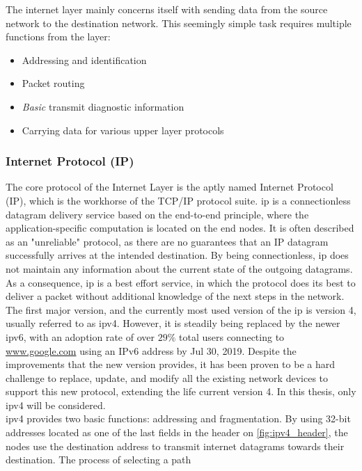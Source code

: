 The internet layer mainly concerns itself with sending data from the source
network to the destination network. This seemingly simple task requires multiple
functions from the layer:
\begin{itemize}
    \item Addressing and identification
    \item Packet routing
    \item \emph{Basic} transmit diagnostic information
    \item Carrying data for various upper layer protocols
\end{itemize}

\subsubsection{Internet Protocol (IP)}
The core protocol of the Internet Layer is the aptly named Internet Protocol
(IP), which is the workhorse of the TCP/IP protocol suite.
\gls{ip} is a connectionless datagram delivery service based on the
end-to-end principle, where the application-specific computation is located on
the end nodes. It is often described as an "unreliable" protocol, as there are
no guarantees that an IP datagram successfully arrives at the intended
destination. By being connectionless, \gls{ip} does not maintain any
information about the current state of the outgoing datagrams.
As a consequence, \gls{ip} is a best effort service, in which the protocol does
its best to deliver a packet without additional knowledge of the next steps in
the network\cite{tcpip_illustrated_vol1}.\\
The first major version, and the currently most used version of the \gls{ip}
is version 4, usually referred to as \gls{ipv4}. However, it is steadily
being replaced by the newer \gls{ipv6}, with an adoption rate of over $29\%$
total users connecting to \url{www.google.com} using an IPv6 address by Jul
30, 2019\cite{google_ipv6_adoption}. Despite the improvements that the new
version provides, it has been proven to be a hard challenge to replace, update,
and modify all the existing network devices to support this new protocol,
extending the life current version 4. In this thesis, only \gls{ipv4} will
be considered.\\
\gls{ipv4} provides two basic functions: addressing and fragmentation. By using
32-bit addresses located as one of the last fields in the header on
\autoref{fig:ipv4_header}, the nodes use the destination address to transmit
internet datagrams towards their destination. The process of selecting a path
